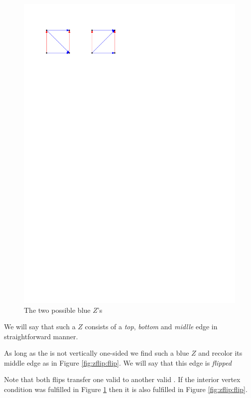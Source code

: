     \begin{figure}[h]
      \centering
      \includegraphics[scale=1]{unifiedAlgo/img/zflip/blueZ.pdf}
      \caption{The two possible blue $Z$'s}
      \label{fig:zflip:blueZ}
    \end{figure}

    We will say that such a $Z$ consists of a \emph{top}, \emph{bottom} and \emph{midlle} edge in straightforward manner. 


    As long as the \rel is not vertically one-sided we find such a blue $Z$ and recolor its middle edge as in Figure \ref{fig:zflip:flip}. We will say that this edge is \emph{flipped}

    Note that both flips transfer one valid \rel to another valid \rel. If the interior vertex condition was fulfilled in Figure \ref{fig:zflip:blueZ} then it is also fulfilled in Figure \ref{fig:zflip:flip}.

